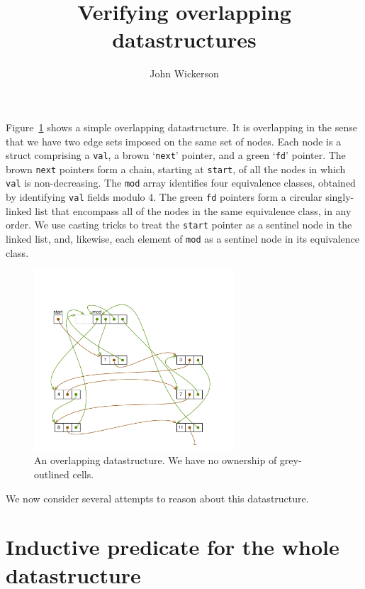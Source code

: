 \documentclass[12pt,a4paper]{article}
\title{Verifying overlapping datastructures}
\author{John Wickerson}
\date{}
\begin{document}
\maketitle


Figure~\ref{fig:contrived} shows a simple overlapping datastructure. It is overlapping in the sense that we have two edge sets imposed on the same set of nodes. Each node is a struct comprising a {\tt val}, a brown `{\tt next}' pointer, and a green `{\tt fd}' pointer. The brown {\tt next} pointers form a chain, starting at {\tt start}, of all the nodes in which {\tt val} is non-decreasing. The {\tt mod} array identifies four equivalence classes, obtained by identifying {\tt val} fields modulo 4. The green {\tt fd} pointers form a circular singly-linked list that encompass all of the nodes in the same equivalence class, in any order. We use casting tricks to treat the {\tt start} pointer as a sentinel node in the linked list, and, likewise, each element of {\tt mod} as a sentinel node in its equivalence class.

\begin{figure}[tbp]
\centering
\includegraphics[width=75mm]{contrived.pdf}
\caption{An overlapping datastructure. We have no ownership of grey-outlined cells.}
\label{fig:contrived}
\end{figure}

We now consider several attempts to reason about this datastructure.

\section{Inductive predicate for the whole datastructure}
\end{document}
